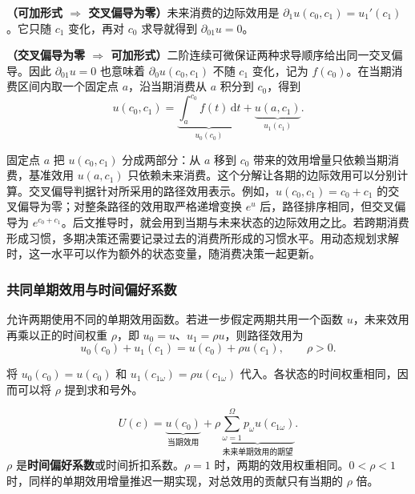 \begin{solution}[label-content={证明},blank-type=none]
\textbf{（可加形式 $\Rightarrow$ 交叉偏导为零）}未来消费的边际效用是 $\partial_1u(c_0,c_1)=u_1'(c_1)$。它只随 $c_1$ 变化，再对 $c_0$ 求导就得到 $\partial_{01}u=0$。

\textbf{（交叉偏导为零 $\Rightarrow$ 可加形式）}二阶连续可微保证两种求导顺序给出同一交叉偏导。因此 $\partial_{01}u=0$ 也意味着 $\partial_0u(c_0,c_1)$ 不随 $c_1$ 变化，记为 $f(c_0)$。在当期消费区间内取一个固定点 $a$，沿当期消费从 $a$ 积分到 $c_0$，得到
\[
 u(c_0,c_1)=\underbrace{\int_a^{c_0} f(t)\,\mathrm dt}_{u_0(c_0)}
            +\underbrace{u(a,c_1)}_{u_1(c_1)}.
\]
\end{solution}

固定点 $a$ 把 $u(c_0,c_1)$ 分成两部分：从 $a$ 移到 $c_0$ 带来的效用增量只依赖当期消费，基准效用 $u(a,c_1)$ 只依赖未来消费。这个分解让各期的边际效用可以分别计算。交叉偏导判据针对所采用的路径效用表示。例如，$u(c_0,c_1)=c_0+c_1$ 的交叉偏导为零；对整条路径的效用取严格递增变换 $e^u$ 后，路径排序相同，但交叉偏导为 $e^{c_0+c_1}$。后文推导时，就会用到当期与未来状态的边际效用之比。若跨期消费形成习惯，多期决策还需要记录过去的消费所形成的习惯水平。用动态规划求解时，这一水平可以作为额外的状态变量，随消费决策一起更新。


\subsubsection{共同单期效用与时间偏好系数}
 允许两期使用不同的单期效用函数。若进一步假定两期共用一个函数 $u$，未来效用再乘以正的时间权重 $\rho$，即 $u_0=u$、$u_1=\rho u$，则路径效用为
\[
 u_0(c_0)+u_1(c_1)=u(c_0)+\rho u(c_1),\qquad \rho>0.
\]

将 $u_0(c_0)=u(c_0)$ 和 $u_1(c_{1\omega})=\rho u(c_{1\omega})$ 代入。各状态的时间权重相同，因而可以将 $\rho$ 提到求和号外。
\begin{tcolorbox}[knowledge,title=时间可加的标准形式]
\begin{equation}
 U(c)=\underbrace{u(c_0)}_{\text{当期效用}}
     +\rho\underbrace{\sum_{\omega=1}^{\Omega}p_\omega u(c_{1\omega})}_{\text{未来单期效用的期望}}.
 \label{eq:wj-six-4}
\end{equation}
$\rho$ 是\textbf{时间偏好系数}或时间折扣系数。$\rho=1$ 时，两期的效用权重相同。$0<\rho<1$ 时，同样的单期效用增量推迟一期实现，对总效用的贡献只有当期的 $\rho$ 倍。
\end{tcolorbox}

